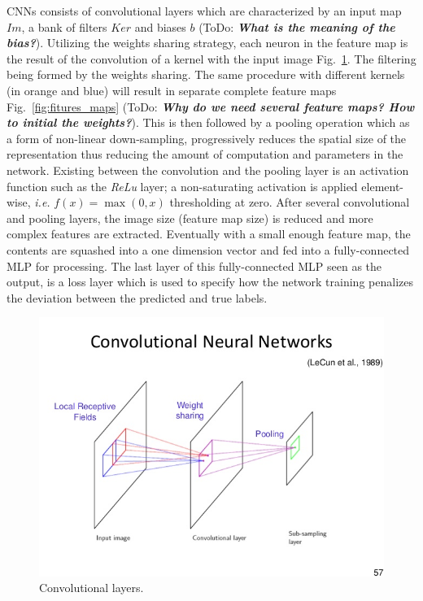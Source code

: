 \documentclass[final, paper=letter,5p,times,twocolumn]{elsarticle}
\newcommand{\ToDo}[1]{ToDo: \textbf{\textit{#1}}}
\begin{document}
CNNs consists of convolutional layers which are characterized by an input map $Im$, a bank of filters $Ker$ and biases $b$ (\ToDo{What is the meaning of the bias?}). Utilizing the weights sharing strategy, each neuron in the feature map is the result of the convolution of a kernel with the input image Fig.~\ref{fig:Convolutional_layers}. The filtering being formed by the weights sharing. The same procedure with different kernels (in orange and blue) will result in separate complete feature maps Fig.~\ref{fig:fitures_maps} (\ToDo{Why do we need several feature maps? How to initial the weights?}). This is then followed by a pooling operation which as a form of non-linear down-sampling, progressively reduces the spatial size of the representation thus reducing the amount of computation and parameters in the network. Existing between the convolution and the pooling layer is an activation function such as the {\it ReLu} layer; a non-saturating activation is applied element-wise, {\it i.e.} $f(x) = \max(0,x)$ thresholding at zero. After several convolutional and pooling layers, the image size (feature map size) is reduced and more complex features are extracted. Eventually with a small enough feature map, the contents are squashed into a one dimension vector and fed into a fully-connected MLP for processing. The last layer of this fully-connected MLP seen as the output, is a loss layer which is used to specify how the network training penalizes the deviation between the predicted and true labels.


\begin{figure}[htbp]
   \begin{center}
      \includegraphics[scale=0.2, angle=0]{images/Bishop_cnn_layer.jpg}
   \end{center}
   \caption{Convolutional layers.}
  \label{fig:Convolutional_layers} 
\end{figure}
\end{document}
